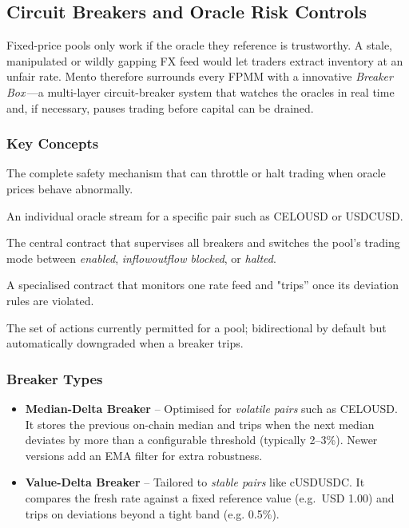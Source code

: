 \documentclass[a4paper]{article}
\providecommand{\hyp}{-}
\theoremstyle{definition}
\begin{document}
\subsection{Circuit Breakers and Oracle Risk Controls}\label{sec:breaker_box}
Fixed\hyp price pools only work if the oracle they reference is
trustworthy. A stale, manipulated or wildly gapping FX feed would let
traders extract inventory at an unfair rate.
Mento therefore surrounds every FPMM with a innovative \emph{Breaker Box}\,—a
multi\hyp layer circuit\hyp breaker system that watches the oracles in real
time and, if necessary, pauses trading before capital can be drained.

\subsubsection*{Key Concepts}
\begin{description}[leftmargin=*]
  \item[Circuit Breaker] The complete safety mechanism that can throttle or
        halt trading when oracle prices behave abnormally.
  \item[Rate Feed] An individual oracle stream for a specific pair such as
        CELO\/USD or USDC\/USD.
  \item[Breaker Box] The central contract that supervises all breakers and
        switches the pool's trading mode between \textit{enabled},
        \textit{inflow\/outflow blocked}, or \textit{halted}.
  \item[Breaker] A specialised contract that monitors one rate feed and
        "trips'' once its deviation rules are violated.
  \item[Trading Mode] The set of actions currently permitted for a pool;
        bidirectional by default but automatically downgraded when a breaker
        trips.
\end{description}

\subsubsection*{Breaker Types}
\begin{itemize}[leftmargin=*]
  \item \textbf{Median\hyp Delta Breaker} – Optimised for \emph{volatile pairs}
        such as CELO\/USD. It stores the previous on\hyp chain median and trips
        when the next median deviates by more than a configurable threshold
        (typically 2–3\%). Newer versions add an EMA filter for extra
        robustness.
  \item \textbf{Value\hyp Delta Breaker} – Tailored to \emph{stable pairs} like
        cUSD\/USDC. It compares the fresh rate against a fixed reference value
        (e.g.\ USD 1.00) and trips on deviations beyond a tight band (e.g.
        0.5\%).
\end{itemize}
\end{document}
